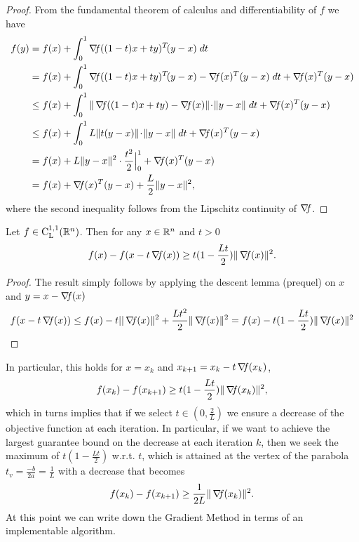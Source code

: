 \documentclass[10pt,a4paper]{article}
\begin{document}
\begin{proof}
From the fundamental theorem of calculus and differentiability of $f$ we have 
\begin{equation*}
	\begin{split}
		f (y) & = f(x) + \int_{0}^{1} \grad((1-t)x + t y)^T\! (y-x) \; dt\\
		& = f(x) + \int_{0}^{1} \grad((1-t)x + t y)^T\! (y-x) - \grad(x)^T(y-x) \; dt + \grad(x)^T(y-x)\\ 
		&\leq f(x) + \int_{0}^{1} \| \grad((1-t)x + t y) - \grad(x)\|\! \cdot\! \|y-x\| \; dt + \grad(x)^T(y-x)\\  
		& \leq f(x) + \int_{0}^{1} L \| t(y-x) \|\! \cdot\! \|y-x\| \; dt + \grad(x)^T(y-x)\\
		& = f(x) + L\|y-x\|^2 \cdot \frac{t^2}{2} \Big|_0^1 + \grad(x)^T(y-x)\\
		& = f(x) + \grad(x)^T(y-x) + \frac{L}{2} \|y-x\|^2,
	\end{split}
\end{equation*}
where the second inequality follows from the Lipschitz continuity of $\operatorname*{\mathit{\nabla \!f}}$.
\end{proof}
\begin{lemma}\label{lemma:descent} Let $f\in \mathord{\mathrm{C^{1,1}_{L}}}(\mathbb{R}^n)$. Then for any $x \in \mathbb{R}^n$ and $t>0$
	\begin{equation*}
		f(x) - f(x-t\operatorname*{\mathit{\nabla \!f}}(x)) \geq t (1-\frac{Lt}{2}) \| \operatorname*{\mathit{\nabla \!f}}(x)\|^2.
	\end{equation*}
\end{lemma}
\begin{proof}
	The result simply follows by applying the descent lemma (prequel) on $x$ and $y=x-\operatorname*{\mathit{\nabla \!f}}(x)$
	\begin{equation*}
		f(x-t\operatorname*{\mathit{\nabla \!f}}(x))\leq f(x) -t ||\operatorname*{\mathit{\nabla \!f}}(x)\|^2 + \frac{Lt^2}{2} \|\operatorname*{\mathit{\nabla \!f}}(x)\|^2 = f(x) - t (1-\frac{Lt}{2}) \| \operatorname*{\mathit{\nabla \!f}}(x)\|^2
	\end{equation*}
\end{proof}
\noindent In particular, this holds for $x=x_k$ and $x_{k+1} = x_k -t\operatorname*{\mathit{\nabla \!f}}(x_k)$,
\begin{equation*}
	f(x_k) - f(x_{k+1}) \geq t (1-\frac{Lt}{2}) \| \operatorname*{\mathit{\nabla \!f}}(x_k)\|^2,
\end{equation*}
which in turns implies that if we select $t\in (0,\frac{2}{L})$ we ensure a decrease of the objective function at each iteration. In particular, if we want to achieve the largest guarantee bound on the decrease at each iteration $k$, then we seek the maximum of $t (1-\frac{Lt}{2})$ w.r.t. $t$, which is attained at the vertex of the parabola $t_v= \frac{-b}{2a}=\frac{1}{L}$ with a decrease that becomes
\begin{equation}\label{eq:decrease}
	f(x_k) - f(x_{k+1}) \geq \frac{1}{2L} \| \operatorname*{\mathit{\nabla \!f}}(x_k)\|^2.
\end{equation}
At this point we can write down the Gradient Method in terms of an implementable algorithm.
\end{document}
